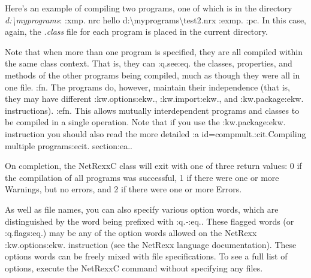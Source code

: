 Here's an example of compiling two programs, one of which is in the
directory \emph{d:\textbackslash myprograms}:
:xmp.
nrc hello d:\textbackslash myprograms\textbackslash test2.nrx
:exmp.
:pc.
In this case, again, the \emph{.class} file for each program is placed
in the current directory.

Note that when more than one program is specified, they are all compiled
within the same class context.  That is, they can :q.see:eq. the
classes, properties, and methods of the other programs being compiled,
much as though they were all in one file.
:fn.
The programs do, however, maintain their independence (that is, they may
have different :kw.options:ekw., :kw.import:ekw., and :kw.package:ekw.
instructions).
:efn.
This allows mutually interdependent programs and classes to be compiled
in a single operation.
Note that if you use the :kw.package:ekw. instruction you should also
read the more detailed :a id=compmult.:cit.Compiling multiple
programs:ecit. section:ea..

On completion, the NetRexxC class will exit with one of three return
values: 0 if the compilation of all programs was successful, 1 if there
were one or more Warnings, but no errors, and 2 if there were one or
more Errors.

As well as file names, you can also specify various option words, which
are distinguished by the word being prefixed with :q.\emph{-}:eq..  These
flagged words (or :q.flags:eq.) may be any of the option words allowed
on the NetRexx :kw.options:ekw. instruction (see the NetRexx language
documentation).  These options words can be freely mixed with file
specifications.  To see a full list of options, execute the NetRexxC
command without specifying any files.


